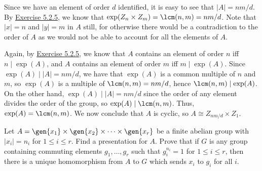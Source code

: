 \begin{sol}
    Since we have an element of order $d$ identified, it is easy to see that $|A| = nm/d$. By \hyperref[ex5.2.5]{Exercise 5.2.5}, we know that $\exp(Z_n \times Z_m) = \lcm(n, m) = nm/d$. Note that $|x| = n$ and $|y| = m$ in $A$ still, for otherwise there would be a contradiction to the order of $A$ as we would not be able to account for all the elements of $A$.

    Again, by \hyperref[ex5.2.5]{Exercise 5.2.5}, we know that $A$ contains an element of order $n$ iff $n \mid \exp(A)$, and $A$ contains an element of order $m$ iff $m \mid \exp(A)$. Since $\exp(A) \mid |A| = nm/d$, we have that $\exp(A)$ is a common multiple of $n$ and $m$, so $\exp(A)$ is a multiple of $\lcm(n, m) = nm/d$, hence $\lcm(n, m) \mid \exp(A)$. On the other hand, $\exp(A) \mid |A| = nm/d$ since the order of any element divides the order of the group, so $\exp(A) \mid \lcm(n, m)$. Thus, $\exp(A) = \lcm(n, m)$. We now conclude that $A$ is cyclic, so $A \cong Z_{nm/d} \times Z_1$.
\end{sol}

\newpage

\begin{exercise}\label{ex5.2.13}
    Let $A = \gen{x_1} \times \gen{x_2} \times \cdots \times \gen{x_r}$ be a finite abelian group with $|x_i| = n_i$ for $1 \leq i \leq r$. Find a presentation for $A$. Prove that if $G$ is any group containing commuting elements $g_1, \ldots, g_r$ such that $g_i^{n_i} = 1$ for $1 \leq i \leq r$, then there is a unique homomorphism from $A$ to $G$ which sends $x_i$ to $g_i$ for all $i$.
\end{exercise}


